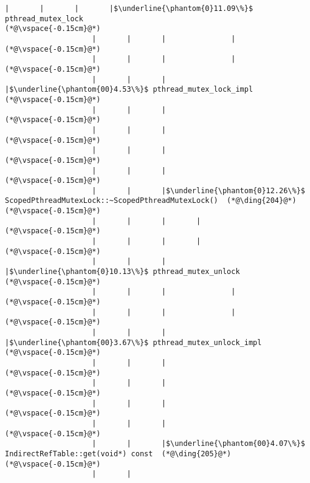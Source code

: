\begin{lstlisting}[caption=Metodikutsu C$\to$Java 20 viiteparametrilla, label=profile:C2JBenchmark00206, numberbychapter=true, frame=lines, float, floatplacement=t]
                    |       |       |       |$\underline{\phantom{0}11.09\%}$ pthread_mutex_lock
(*@\vspace{-0.15cm}@*)
                    |       |       |               |
(*@\vspace{-0.15cm}@*)
                    |       |       |               |
(*@\vspace{-0.15cm}@*)
                    |       |       |               |$\underline{\phantom{00}4.53\%}$ pthread_mutex_lock_impl
(*@\vspace{-0.15cm}@*)
                    |       |       |        
(*@\vspace{-0.15cm}@*)
                    |       |       |        
(*@\vspace{-0.15cm}@*)
                    |       |       |
(*@\vspace{-0.15cm}@*)
                    |       |       |
(*@\vspace{-0.15cm}@*)
                    |       |       |$\underline{\phantom{0}12.26\%}$ ScopedPthreadMutexLock::~ScopedPthreadMutexLock()  (*@\ding{204}@*)
(*@\vspace{-0.15cm}@*)
                    |       |       |       |
(*@\vspace{-0.15cm}@*)
                    |       |       |       |
(*@\vspace{-0.15cm}@*)
                    |       |       |       |$\underline{\phantom{0}10.13\%}$ pthread_mutex_unlock
(*@\vspace{-0.15cm}@*)
                    |       |       |               |
(*@\vspace{-0.15cm}@*)
                    |       |       |               |
(*@\vspace{-0.15cm}@*)
                    |       |       |               |$\underline{\phantom{00}3.67\%}$ pthread_mutex_unlock_impl
(*@\vspace{-0.15cm}@*)
                    |       |       |        
(*@\vspace{-0.15cm}@*)
                    |       |       |        
(*@\vspace{-0.15cm}@*)
                    |       |       |
(*@\vspace{-0.15cm}@*)
                    |       |       |
(*@\vspace{-0.15cm}@*)
                    |       |       |$\underline{\phantom{00}4.07\%}$ IndirectRefTable::get(void*) const  (*@\ding{205}@*)
(*@\vspace{-0.15cm}@*)
                    |       |

\end{lstlisting}
